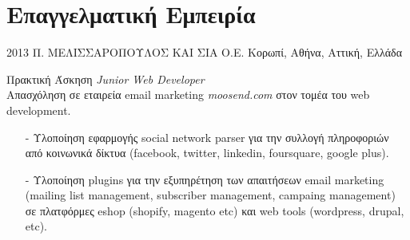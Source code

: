 \documentclass[print]{keros-cv} %
\begin{document}
\section{Επαγγελματική Εμπειρία}

\begin{entrylist}
\entry
{2013}
{Π. ΜΕΛΙΣΣΑΡΟΠΟΥΛΟΣ ΚΑΙ ΣΙΑ Ο.Ε.}
{Κορωπί, Αθήνα, Αττική, Ελλάδα}
{Πρακτική Άσκηση \emph{Junior Web Developer} \\
Απασχόληση σε εταιρεία email marketing \emph{moosend.com} στον τομέα
του web development.
\begin{itemize}
\item[-] Υλοποίηση εφαρμογής social network parser για την συλλογή πληροφοριών από
κοινωνικά δίκτυα (facebook, twitter, linkedin, foursquare, google plus).
\item[-] Υλοποίηση plugins για την εξυπηρέτηση των απαιτήσεων email marketing (mailing list management, subscriber management, campaing management) σε πλατφόρμες eshop (shopify, magento etc) και web tools (wordpress, drupal, etc).
\end{itemize}}
\end{entrylist}

\end{document}
